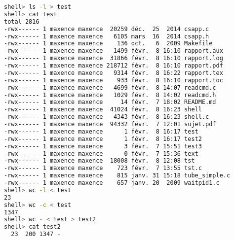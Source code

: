 \documentclass{report}
\begin{document}
		\begin{lstlisting}[frame=single,basicstyle=\footnotesize,language=bash]
shell> ls -l > test
shell> cat test
total 2816
-rwx------ 1 maxence maxence  20259 déc.  25  2014 csapp.c
-rwx------ 1 maxence maxence   6105 mars  16  2014 csapp.h
-rwx------ 1 maxence maxence    136 oct.   6  2009 Makefile
-rwx------ 1 maxence maxence   1499 févr.  8 16:10 rapport.aux
-rwx------ 1 maxence maxence  31866 févr.  8 16:10 rapport.log
-rwx------ 1 maxence maxence 218712 févr.  8 16:10 rapport.pdf
-rwx------ 1 maxence maxence   9314 févr.  8 16:22 rapport.tex
-rwx------ 1 maxence maxence    933 févr.  8 16:10 rapport.toc
-rwx------ 1 maxence maxence   4699 févr.  8 14:07 readcmd.c
-rwx------ 1 maxence maxence   1029 févr.  8 14:02 readcmd.h
-rwx------ 1 maxence maxence     14 févr.  7 18:02 README.md
-rwx------ 1 maxence maxence  41024 févr.  8 16:23 shell
-rwx------ 1 maxence maxence   4343 févr.  8 16:23 shell.c
-rwx------ 1 maxence maxence  94332 févr.  7 12:01 sujet.pdf
-rwx------ 1 maxence maxence      1 févr.  8 16:17 test
-rwx------ 1 maxence maxence      1 févr.  8 16:17 test2
-rwx------ 1 maxence maxence      3 févr.  7 15:51 test3
-rwx------ 1 maxence maxence      0 févr.  7 15:36 text
-rwx------ 1 maxence maxence  18008 févr.  8 12:08 tst
-rwx------ 1 maxence maxence    723 févr.  7 13:55 tst.c
-rwx------ 1 maxence maxence    815 janv. 31 15:18 tube_simple.c
-rwx------ 1 maxence maxence    657 janv. 20  2009 waitpid1.c
shell> wc -l < test
23
shell> wc -c < test
1347
shell> wc - < test > test2
shell> cat test2
  23  200 1347 -
		\end{lstlisting}
\end{document}
